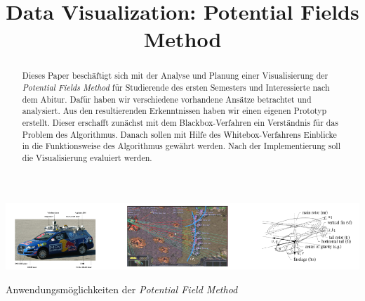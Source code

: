 \documentclass[sigchi, review]{acmart}
\begin{document}
\title{Data Visualization: Potential Fields Method}






\begin{abstract}
Dieses Paper beschäftigt sich mit der Analyse und Planung einer Visualisierung der \textit{Potential Fields Method} für Studierende des ersten Semesters und Interessierte nach dem Abitur. Dafür haben wir  verschiedene vorhandene Ansätze betrachtet und analysiert. Aus den resultierenden Erkenntnissen haben wir einen eigenen Prototyp erstellt. Dieser erschafft zunächst mit dem Blackbox-Verfahren ein Verständnis für das Problem des Algorithmus. Danach sollen mit Hilfe des Whitebox-Verfahrens Einblicke in die Funktionsweise des Algorithmus gewährt werden. Nach der Implementierung soll die Visualisierung evaluiert werden.
\end{abstract}



\begin{teaserfigure}
  \includegraphics[width=\textwidth]{img/teaser}
  \caption{Anwendungsmöglichkeiten der \textit{Potential Field Method}~\cite{hagelback2012potential}\cite{montemerlo2008junior}\cite{paul2008uav}}
  \label{fig:teaser}
\end{teaserfigure}


\maketitle





%

\end{document}
